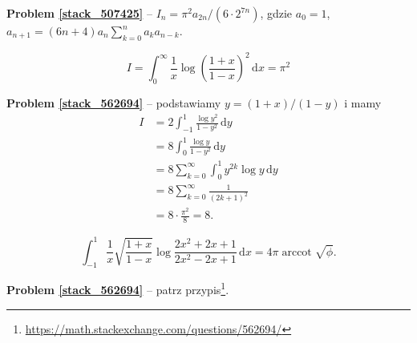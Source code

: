 \textbf{Problem \ref{stack_507425}} -- $I_n = \pi^2 a_{2n} / (6 \cdot 2^{7n})$, gdzie $a_0 = 1$, $a_{n+1} = (6n+4)a_n \sum_{k=0}^n a_k a_{n-k}$. %

\begin{problem}[pytanie 541751]
    \label{stack_541751}%
    \begin{equation}
        I = \int_0^\infty \frac{1}{x} \log \left(\frac{1+x}{1-x}\right)^2 \,\mathrm{d}x = \pi^2
    \end{equation}
\end{problem}

\textbf{Problem \ref{stack_562694}} -- podstawiamy $y = (1+x) / (1-y)$ i mamy %
\begin{align} %
    I & = 2 \int_{-1}^1 \frac{\log y^2}{1-y^2} \,\mathrm{d}y \\ %
        & = 8 \int_0^1 \frac{\log y}{1-y^2} \, \mathrm{d}{y} \\ %
        & = 8 \sum_{k=0}^\infty \int_0^1 y^{2k} \log y \,\mathrm{d} y \\ %
        & = 8 \sum_{k=0}^\infty \frac{1}{(2k+1)^2} \\ %
        & = 8 \cdot \frac{\pi^2}{8} = 8. %
\end{align} %

\begin{problem}[pytanie 562694]
    \label{stack_562694}%
    \begin{equation}
        \int_{-1}^1 \frac{1}{x} \sqrt{\frac{1+x}{1-x}} \log \frac{2x^2+2x+1}{2x^2-2x+1} \,\mathrm{d}x = 4 \pi \operatorname{arccot} \sqrt{\phi}.
    \end{equation}
\end{problem}

\textbf{Problem \ref{stack_562694}} -- patrz przypis\footnote{\url{https://math.stackexchange.com/questions/562694/}}. %


%